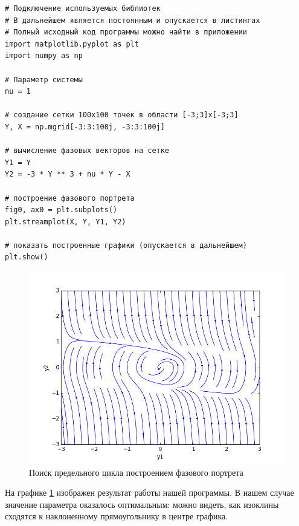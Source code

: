 \begin{program}
  \caption{Построение фазового портрета}
  \label{lab1:prog:1}
  \begin{verbatim}
# Подключение используемых библиотек
# В дальнейшем является постоянным и опускается в листингах
# Полный исходный код программы можно найти в приложении 
import matplotlib.pyplot as plt
import numpy as np

# Параметр системы
nu = 1

# создание сетки 100х100 точек в области [-3;3]x[-3;3]
Y, X = np.mgrid[-3:3:100j, -3:3:100j]

# вычисление фазовых векторов на сетке
Y1 = Y
Y2 = -3 * Y ** 3 + nu * Y - X

# построение фазового портрета
fig0, ax0 = plt.subplots()
plt.streamplot(X, Y, Y1, Y2)

# показать построенные графики (опускается в дальнейшем)
plt.show()    
  \end{verbatim}
\end{program}
\clearpage


\begin{figure}[thp]
  \centering
  \includegraphics[width=\textwidth]{figures/1_streamplot}
  \caption{Поиск предельного цикла построением фазового портрета}
  \label{lab1:streamplot}
\end{figure}

На графике \ref{lab1:streamplot} изображен результат работы нашей программы.
В нашем случае значение параметра оказалось оптимальным: можно видеть, как
изоклины сходятся к наклоненному прямоугольнику в центре графика. 

